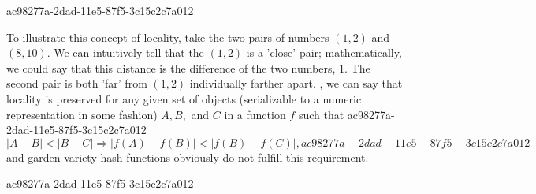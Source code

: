 \documentclass[12pt]{article}
\begin{document}
ac98277a-2dad-11e5-87f5-3c15c2c7a012\par To illustrate this concept of locality, take the two pairs of numbers $(1,2)$ and $(8,10)$. We can intuitively tell that the $(1,2)$ is a 'close' pair; mathematically, we could say that this distance is the difference of the two numbers, $1$. The second pair is both 'far' from $(1,2)$ individually farther apart. , we can say that locality is preserved for any given set of objects (serializable to a numeric representation in some fashion) $A,B,$ and $C$ in a function $f$ such that
ac98277a-2dad-11e5-87f5-3c15c2c7a012\begin{equation}
|A-B| < |B-C| \Rightarrow |f(A)-f(B)| < |f(B) - f(C)|,
ac98277a-2dad-11e5-87f5-3c15c2c7a012\end{equation}
and garden variety hash functions obviously do not fulfill this requirement.

\printbibliography
ac98277a-2dad-11e5-87f5-3c15c2c7a012
\end{document}

